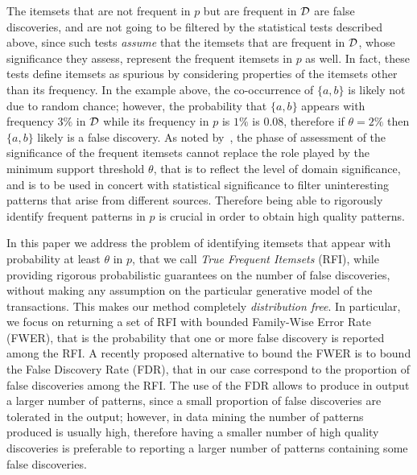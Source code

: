 The itemsets
that are not frequent in $p$ but are frequent in ${\cal D}$ are false discoveries, and are not going to be filtered by
the statistical tests described above, since such tests \emph{assume} that the
itemsets that are frequent in ${\cal D}$, whose significance they assess, represent the frequent itemsets
in $p$ as well. In fact, these tests define itemsets as spurious by considering
properties of the itemsets other than its frequency. In the example above, the
co-occurrence of $\{a,b\}$ is likely not due to random chance; however, the
probability that $\{a,b\}$ appears with frequency $3\%$  in ${\cal D}$ while its
frequency in $p$ is $1\%$ is $0.08$, therefore if $\theta=2\%$ then $\{a,b\}$ likely is a false
discovery. As noted by~\citet{LiuZW11}, the phase of assessment of the
significance of the frequent itemsets cannot replace the role played by the minimum support
threshold $\theta$, that is to reflect the level of domain significance, and is to be used
in concert with statistical significance to filter uninteresting patterns that
arise from different sources. Therefore being able to rigorously identify frequent patterns in $p$ 
is crucial in order to obtain high quality patterns.

In this paper we address the problem of
identifying itemsets that appear with probability at least $\theta$ in $p$,
that we call \emph{True Frequent Itemsets} (RFI), while providing rigorous
probabilistic guarantees on the number of false discoveries, without making any
assumption on the particular generative model of the transactions. This makes
our method completely \emph{distribution free}. In particular, we focus on
returning a set of RFI with bounded Family-Wise Error Rate (FWER), that is the
probability that one or more false discovery is reported among the RFI. A
recently proposed alternative to  bound the FWER is to bound the False Discovery
Rate (FDR), that in our case correspond to the proportion of false discoveries
among the RFI. The use of the FDR allows to produce in output a larger number of
patterns, since a small proportion of false discoveries are tolerated in the output;
however, in data mining the number of patterns produced is usually high,
therefore having a smaller number of high quality discoveries is preferable to
reporting a larger number of patterns containing some false discoveries.
\fi

\iffalse
{\bf XXX:} we should explain here what a statistical test is, what the FWER,
what the difference with the FDR, and so on. If we do it well here, we probably
do not need to do it again the preliminaries.

{\bf XXX:} We should really stress that we are not mining ``statistically
significant'' itemsets, as this would imply some kind of underlying model (e.g.,
``items appear independently in transactions'') that instead we do not have. I
believe we should actually somewhat comment on such models, which are clearly
too simplistic to be really useful/meaningful: in real/natural data generation
processes itemsets \emph{clearly} do not appear independently, so comparing the
dataset to such a model is only of limited value. 
\fi


